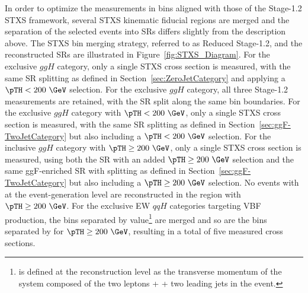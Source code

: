 In order to optimize the measurements in bins aligned with those of the Stage-1.2 STXS framework, several STXS kinematic fiducial regions are merged and the separation of the selected events into SRs differs slightly from the description above.
The STXS bin merging strategy, referred to as Reduced Stage-1.2, and the reconstructed SRs are illustrated in Figure~\ref{fig:STXS_Diagram}.
For the exclusive \ZeroJet $ggH$ category, only a single STXS cross section is measured, with the same SR splitting as defined in Section~\ref{sec:ZeroJetCategory} and applying a $\pTH < 200~\GeV$ selection.
For the exclusive \OneJet $ggH$ category, all three Stage-1.2 measurements are retained, with the SR split along the same \pTH bin boundaries.
For the exclusive \TwoJet $ggH$ category with $\pTH < 200~\GeV$, only a single STXS cross section is measured, with the same SR splitting as defined in Section~\ref{sec:ggF-TwoJetCategory} but also including a $\pTH < 200~\GeV$ selection.
For the \Njets inclusive $ggH$ category with $\pTH \ge200~\GeV$, only a single STXS cross section is measured, using both the \OneJet SR with an added $\pTH \ge200~\GeV$ selection and the same ggF-enriched \TwoJet SR with splitting as defined in Section~\ref{sec:ggF-TwoJetCategory} but also including a $\pTH \ge200~\GeV$ selection. No events with \ZeroJet at the event-generation level are reconstructed in the region with $\pTH \ge200~\GeV$.
For the exclusive \TwoJet EW $qqH$ categories targeting VBF production, the bins separated by \pTHjj value\footnote{\pTHjj is defined at the reconstruction level as the transverse momentum of the system composed of the two leptons + \met + two leading jets in the event.} are merged and so are the bins separated by \mjj for $\pTH \ge200~\GeV$, resulting in a total of five measured cross sections.
